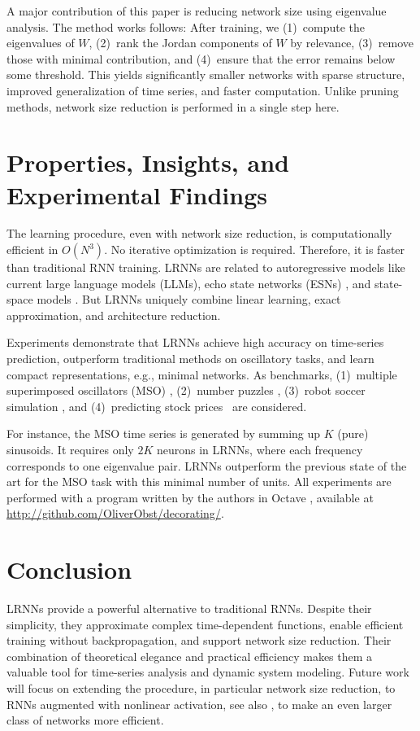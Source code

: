 \documentclass[11pt]{llncs}
\begin{document}
A major contribution of this paper is reducing network size using eigenvalue
analysis. The method works follows: After training, we (1)~compute the
eigenvalues of $W$, (2)~rank the Jordan components of $W$ by relevance,
(3)~remove those with minimal contribution, and (4)~ensure that the error
remains below some threshold. This yields significantly smaller networks with
sparse structure, improved generalization of time series, and faster
computation. Unlike pruning methods, network size reduction is performed in a
single step here.

\section{Properties, Insights, and Experimental Findings}

The learning procedure, even with network size reduction, is computationally
efficient in $O(N^3)$. No iterative optimization is required. Therefore, it is
faster than traditional RNN training. LRNNs are related to autoregressive models
\cite{Aka69} like current large language models (LLMs), echo state networks
(ESNs) \cite{JH04}, and state-space models \cite{GGR22,OS+23}. But LRNNs
uniquely combine linear learning, exact approximation, and architecture
reduction.

Experiments demonstrate that LRNNs achieve high accuracy on time-series
prediction, outperform traditional methods on oscillatory tasks, and
learn compact representations, e.g., minimal networks. As benchmarks,
(1)~multiple superimposed oscillators (MSO) \cite{KLB12},
(2)~number puzzles \cite{GW13}, (3)~robot soccer simulation \cite{MO+18}, and (4)~predicting
stock prices~\cite{Lit20} are considered.

For instance, the MSO time series is generated by summing up $K$ (pure)
sinusoids. It requires only $2K$ neurons in LRNNs, where each frequency
corresponds to one eigenvalue pair. LRNNs outperform the previous
state of the art for the MSO task with this minimal number of units. All
experiments are performed with a program written by the authors in Octave
\cite{EB+17}, available at \url{http://github.com/OliverObst/decorating/}.

\section{Conclusion}

LRNNs provide a powerful alternative to traditional
RNNs. Despite their simplicity, they approximate complex time-dependent
functions, enable efficient training without backpropagation, and support
network size reduction. Their combination of theoretical elegance and
practical efficiency makes them a valuable tool for time-series analysis and
dynamic system modeling. Future work will focus on extending the procedure, in
particular network size reduction, to RNNs augmented with nonlinear
activation, see also \cite{BKP16}, to make an even larger class of networks
more efficient.

\clearpage


\end{document}
